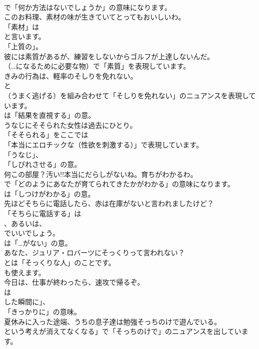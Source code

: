 \documentclass[8pt]{extreport}
\begin{document}
\begin{CJK}{UTF8}{min}
\\	で「何か方法はないでしょうか」の意味になります。	
\\	このお料理、素材の味が生きていてとってもおいしいわ。 
\\	「素材」は
\\	と言います。
\\	「上質の」。	
\\	彼には素質があるが、練習をしないからゴルフが上達しないんだ。 
\\	（…になるために必要な物）で「素質」を表現しています。	
\\	きみの行為は、軽率のそしりを免れない。 
\\	と 
\\	（うまく逃げる）を組み合わせて「そしりを免れない」のニュアンスを表現しています。
\\	は「結果を直視する」の意。	
\\	うなじにそそられた女性は過去にひとり。 
\\	「そそられる」をここでは
\\	「本当にエロチックな（性欲を刺激する）」で表現しています。
\\	「うなじ」、
\\	「しびれさせる」の意。	
\\	何この部屋？汚い!!本当にだらしがないね。育ちがわかるわ。 
\\	で「どのようにあなたが育てられてきたかがわかる」の意味になります。
\\	は「しつけがわかる」の意。	
\\	先ほどそちらに電話したら、赤は在庫がないと言われましたけど？ 
\\	「そちらに電話する」は 
\\	、あるいは、
\\	でいいでしょう。
\\	は「…がない」の意。	
\\	あなた、ジュリア・ロバーツにそっくりって言われない？ 
\\	とは「そっくりな人」のことです。
\\	も使えます。	
\\	今日は、仕事が終わったら、速攻で帰るぞ。 
\\	は
\\	した瞬間に」、
\\	「きっかりに」の意味。	
\\	夏休みに入った途端、うちの息子達は勉強そっちのけで遊んでいる。 
\\	という考えが消えてなくなる」で「そっちのけで」のニュアンスを出しています。	

\end{CJK}
\end{document}
